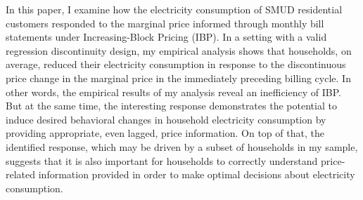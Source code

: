 In this paper, I examine how the electricity consumption of SMUD residential customers responded to the marginal price informed through monthly bill statements under Increasing-Block Pricing (IBP). In a setting with a valid regression discontinuity design, my empirical analysis shows that households, on average, reduced their electricity consumption in response to the discontinuous price change in the marginal price in the immediately preceding billing cycle. In other words, the empirical results of my analysis reveal an inefficiency of IBP. But at the same time, the interesting response demonstrates the potential to induce desired behavioral changes in household electricity consumption by providing appropriate, even lagged, price information. On top of that, the identified response, which may be driven by a subset of households in my sample, suggests that it is also important for households to correctly understand price-related information provided in order to make optimal decisions about electricity consumption. 
